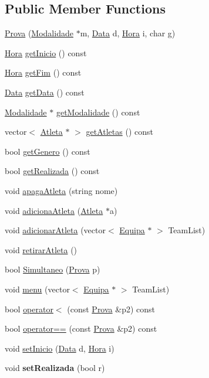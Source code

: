 \subsection*{Public Member Functions}
\begin{DoxyCompactItemize}
\item 
\hyperlink{class_prova_a5d67d4424ea4ed03475ddcf80dee3539}{Prova} (\hyperlink{class_modalidade}{Modalidade} $\ast$m, \hyperlink{class_data}{Data} d, \hyperlink{class_hora}{Hora} i, char g)
\item 
\hyperlink{class_hora}{Hora} \hyperlink{class_prova_a27a6579ac4f103e53cbdd65d1f7994d1}{get\+Inicio} () const 
\item 
\hyperlink{class_hora}{Hora} \hyperlink{class_prova_aef874ac6cf95b34bd3b1574158cddc5f}{get\+Fim} () const 
\item 
\hyperlink{class_data}{Data} \hyperlink{class_prova_a2dbc83f56f67433d62246d9f69629b11}{get\+Data} () const 
\item 
\hyperlink{class_modalidade}{Modalidade} $\ast$ \hyperlink{class_prova_afbf918fbf8ddfd7a2b3785af51536e25}{get\+Modalidade} () const 
\item 
vector$<$ \hyperlink{class_atleta}{Atleta} $\ast$ $>$ \hyperlink{class_prova_a293abf27bb26c97f150be37c3a3e3636}{get\+Atletas} () const 
\item 
bool \hyperlink{class_prova_a5ebde6f5552c4459c0b5b7c677085a9e}{get\+Genero} () const 
\item 
bool \hyperlink{class_prova_abec8bb56f6e6e903b38aad4cc3f50e67}{get\+Realizada} () const 
\item 
void \hyperlink{class_prova_a6ef32c4d0f63b9576db83e4a8d63f390}{apaga\+Atleta} (string nome)
\item 
void \hyperlink{class_prova_abdb9448d1bc2efcb5b94265ddc73f4da}{adiciona\+Atleta} (\hyperlink{class_atleta}{Atleta} $\ast$a)
\item 
void \hyperlink{class_prova_a1bcd2e67e0e1c02ede36154460321df0}{adicionar\+Atleta} (vector$<$ \hyperlink{class_equipa}{Equipa} $\ast$ $>$ Team\+List)
\item 
void \hyperlink{class_prova_aaee7c0aec1a890ab7e09e02f11f11d87}{retirar\+Atleta} ()
\item 
bool \hyperlink{class_prova_a0d9a660b9543ba8c8f9fb4509ff507d6}{Simultaneo} (\hyperlink{class_prova}{Prova} p)
\item 
void \hyperlink{class_prova_a727118e39f0a0b7fe806a2aa437506f7}{menu} (vector$<$ \hyperlink{class_equipa}{Equipa} $\ast$ $>$ Team\+List)
\item 
bool \hyperlink{class_prova_a0da7d3508f91a710a250761498f7e9ba}{operator$<$} (const \hyperlink{class_prova}{Prova} \&p2) const 
\item 
bool \hyperlink{class_prova_a203f2d4d871609222a0621ae631bb1f5}{operator==} (const \hyperlink{class_prova}{Prova} \&p2) const 
\item 
void \hyperlink{class_prova_a1c4b3d8b3b035c063c505797cd0e058b}{set\+Inicio} (\hyperlink{class_data}{Data} d, \hyperlink{class_hora}{Hora} i)
\item 
\hypertarget{class_prova_a8a776096a97adb196c4a9ed62c030a56}{}void {\bfseries set\+Realizada} (bool r)\label{class_prova_a8a776096a97adb196c4a9ed62c030a56}


\end{DoxyCompactItemize}
